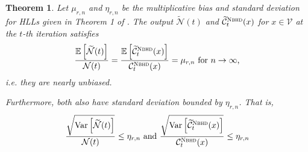 \documentclass[10]{article}
\newtheorem{theorem}{Theorem}[section]
\newcommand{\algoname}[1]{\textnormal{\textsc{#1}}}
\newcommand{\E}{\mathbb{E}}
\newcommand{\Var}{\mathrm{Var}}
\begin{document}
\begin{theorem}
Let $\mu_{r, n}$ and $\eta_{r, n}$ be the multiplicative bias and standard deviation for \algoname{HLL}s given in Theorem 1 of \cite{flajolet2007hyperloglog}.
The output $\widetilde{\mathcal{N}}(t)$ and $\widetilde{\mathcal{C}}^{\algoname{Nbhd}}_t(x)$ for $x \in \mathcal{V}$ at the $t$-th iteration satisfies 
%
\begin{equation*}
	\frac{\E \left [ \widetilde{\mathcal{N}}(t) \right ]}{\mathcal{N}(t)} 
	= \frac{\E \left [ \widetilde{\mathcal{C}}^{\algoname{Nbhd}}_t(x) \right ]}{\mathcal{C}^{\algoname{Nbhd}}_t(x)} 
	= \mu_{r, n} 
	\textnormal{ for $n \rightarrow \infty$,}
\end{equation*}
%
i.e. they are nearly unbiased.

Furthermore, both also have standard deviation bounded by $\eta_{r,n}$.
That is, 
%
\begin{equation*}
	\frac{\sqrt{\Var \left [ \widetilde{\mathcal{N}}(t)\right ]}}{\mathcal{N}(t)} \leq \eta_{r, n}
	\textnormal{ and }
	\frac{\sqrt{\Var \left [ \widetilde{\mathcal{C}}^{\algoname{Nbhd}}_t(x) \right ]}}{\mathcal{C}^{\algoname{Nbhd}}_t(x)} \leq \eta_{r, n}
\end{equation*}
%
%
\end{theorem}
\end{document}
